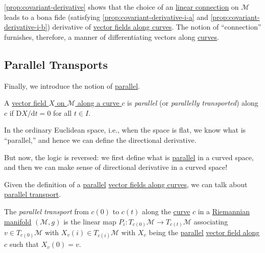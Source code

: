 \begin{remark}
	\autoref{prop:covariant-derivative} shows that the choice of an \hyperref[def:linear-connection]{linear connection} on \(\mathcal{M} \) leads to a bona fide (satisfying \autoref{prop:covariant-derivative-i-a} and \autoref{prop:covariant-derivative-i-b}) derivative of \hyperref[def:vector-field-along-curve]{vector fields along curves}. The notion of ``connection'' furnishes, therefore, a manner of differentiating vectors along \hyperref[def:curve]{curves}.
\end{remark}

\subsection{Parallel Transports}
Finally, we introduce the notion of \hyperref[def:parallel]{parallel}.

\begin{definition}[Parallel]\label{def:parallel}
	A \hyperref[def:vector-field-along-curve]{vector field \(X\) on \(\mathcal{M} \) along a curve \(c\)} is \emph{parallel} (or \emph{parallelly transported}) along \(c\) if \(\mathrm{D} X/ \mathrm{d} t = 0\) for all \(t\in I\).
\end{definition}

\begin{intuition}
	In the ordinary Euclidean space, i.e., when the space is flat, we know what is ``parallel,'' and hence we can define the directional derivative.
	\begin{center}
	\end{center}
	But now, the logic is reversed: we first define what is \hyperref[def:parallel]{parallel} in a curved space, and then we can make sense of directional derivative in a curved space!
\end{intuition}

Given the definition of a \hyperref[def:parallel]{parallel} \hyperref[def:vector-field-along-curve]{vector fields along curves}, we can talk about \hyperref[def:parallel-transport]{parallel transport}.

\begin{definition}\label{def:parallel-transport}
	The \emph{parallel transport} from \(c(0)\) to \(c(t)\) along the \hyperref[def:curve]{curve} \(c\) in a \hyperref[def:Riemannian-manifold]{Riemannian manifold} \((\mathcal{M} , g)\) is the linear map \(P_i \colon T_{c(0)} \mathcal{M} \to T_{c(t) }\mathcal{M} \) associating \(v\in T_{c(0)} \mathcal{M} \) with \(X_v(i)\in T_{c(i)}\mathcal{M} \) with \(X_v\) being the \hyperref[def:parallel]{parallel} \hyperref[def:vector-field-along-curve]{vector field along \(c\)} such that \(X_v (0) = v\).
\end{definition}

